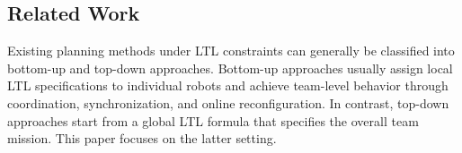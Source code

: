 \documentclass[lettersize,journal]{IEEEtran}
\theoremstyle{italiclemma}
\theoremstyle{italiclemma}
\theoremstyle{definition}
\begin{document}



\subsection{Related Work}
Existing planning methods under LTL constraints can generally be classified into bottom-up and top-down approaches. Bottom-up approaches usually assign local LTL specifications to individual robots and achieve team-level behavior through coordination, synchronization, and online reconfiguration\cite{guo2015multi, 2022Distributed, 10545569}. In contrast, top-down approaches start from a global LTL formula that specifies the overall team mission. This paper focuses on the latter setting.
\end{document}
